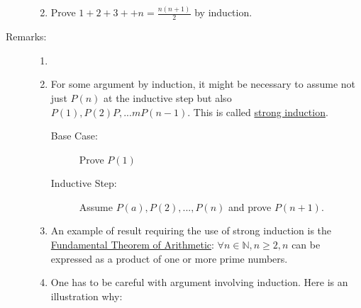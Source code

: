 \documentclass[10pt]{article}
\begin{document}
\begin{description}
\begin{enumerate}
			\item Prove $1+2+3+ +n= \frac{n(n+1)}{2}$ by induction.
		\end{enumerate}
		\item[Remarks:]
		\begin{enumerate}
			\item[]
			\item For some argument by induction, it might be necessary to assume not just $P(n)$ at the inductive step but also $P(1), P(2)P, ...m P(n-1)$. This is called \underline{strong induction}.
			\begin{description}
				\item[Base Case:] Prove $P(1)$
				\item[Inductive Step:] Assume $P(a), P(2), ..., P(n)$ and prove $P(n+1)$.
			\end{description}
			\item[] An example of result requiring the use of strong induction is the \underline{Fundamental Theorem of Arithmetic}: $\forall n \in \mathbb{N}, n \geq 2, n$ can be expressed as a product of one or more prime numbers.
			\item One has to be careful with argument involving induction. Here is an illustration why:

\end{enumerate}
\end{description}
\end{document}

